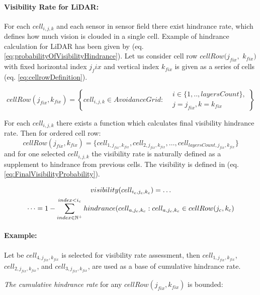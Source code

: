 \paragraph{Visibility Rate for  LiDAR:} For each $cell_{i,j,k}$ and each sensor in sensor field there exist hindrance rate, which defines how much vision is clouded in a single cell. Example of hindrance calculation for LiDAR has been given by (eq. \ref{eq:probabilityOfVisibilityHindrance}). Let us consider cell row $cell Row (j_{fix},$ $k_{fix})$ with fixed horizontal index $j_fix$ and vertical index $k_{fix}$ is given as a series of cells (eq. \ref{eq:cellrowDefinition}).

\begin{equation}\label{eq:cellrowDefinition}
    cellRow(j_{fix},k_{fix})= \left\{cell_{i,j,k}\in Avoidance Grid :\begin{aligned}&i\in\{1,..,layersCount\},\\&j=j_{fix}, k=k_{fix}\end{aligned}\right\}
\end{equation}

For each $cell_{i,j,k}$ there exists a function which calculates final visibility hindrance rate. Then for ordered cell row:
\begin{equation*}
    cell Row(j_{fix},k_{fix}) = \{cell_{1,j_{fix},k_{fix}},  cell_{2,j_{fix},k_{fix}}, \dots, cell_{layers Count,j_{fix},k_{fix}}\}    
\end{equation*}
and for one selected $cell_{i,j,k}$ the visibility rate is naturally defined as a supplement to hindrance from previous cells. The visibility is defined in (eq. \ref{eq:FinalVisibilityProbability}).

\begin{multline}\label{eq:FinalVisibilityProbability}
    visibility(cell_{i_c,j_c,k_c})=\dots\\ \dots =1 - \sum_{index\in\mathbb{N}^+}^{index < i_c} hindrance(cell_{a,j_c,k_c}: cell_{a,j_c,k_c}\in cell Row(j_{c},k_{c})
\end{multline}

\paragraph{Example:} Let be $cell_{4,j_{fix},k_{fix}}$ is selected for visibility rate assessment, then $cell_{1,j_{fix},k_{fix}}$, $cell_{2,j_{fix},k_{fix}}$, and $cell_{3,j_{fix},k_{fix}}$, are used as a base of cumulative hindrance rate.

\noindent \emph{The cumulative hindrance rate} for any $cell Row(j_{fix},k_{fix})$ is bounded:

